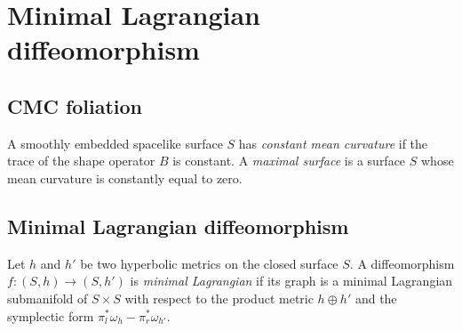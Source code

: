 \chapter{Minimal Lagrangian diffeomorphism}

\section{CMC foliation}
A smoothly embedded spacelike surface $S$ has \textit{constant mean curvature} if the trace of the shape operator $B$ is constant. A \textit{maximal surface} is a surface $S$ whose mean curvature is constantly equal to zero.




\section{Minimal Lagrangian diffeomorphism}
\begin{definition}
    Let $h$ and $h'$ be two hyperbolic metrics on the closed surface $S$. A diffeomorphism $f: (S,h) \to (S,h')$ is \textit{minimal Lagrangian} if its graph is a minimal Lagrangian submanifold of $S\times S$ with respect to the product metric $h \oplus h'$ and the symplectic form $\pi_l^*\omega_h - \pi_r^* \omega_{h'}$. 
\end{definition}


